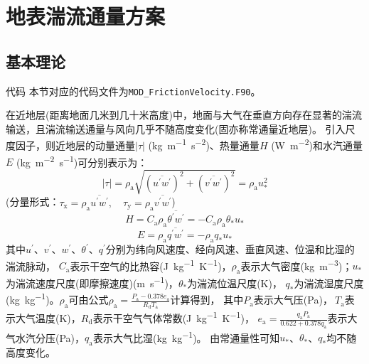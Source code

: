 \chapter{地表湍流通量方案}\label{ch:地表湍流通量}

\section{基本理论}\label{基本理论}
\begin{mymdframed}{代码}
  本节对应的代码文件为\texttt{MOD\_FrictionVelocity.F90}。
\end{mymdframed}

在近地层(距离地面几米到几十米高度)中，地面与大气在垂直方向存在显著的湍流输送，且湍流输送通量与风向几乎不随高度变化(固亦称常通量近地层)。
引入尺度因子，则近地层的动量通量$\left|\tau\right|$ (\unit{kg.m^{-1}.s^{-2}})、热量通量$H$ (\unit{W.m^{-2}})和水汽通量$E$ (\unit{kg.m^{-2}.s^{-1}})可分别表示为：
\begin{equation}
  |\tau|=\rho_{\mathrm{a}} \sqrt{ \left(\overline{u^{\prime} w^{\prime}}\right)^{2} + \left(\overline{v^{\prime} w^{\prime}}\right)^{2} }=\rho_{\mathrm{a}} u_{*}^{2}
\end{equation}
(分量形式：$\tau_{\mathrm{x}}=\rho_{\mathrm{a}} \overline{u^{\prime} w^{\prime}}, \quad \tau_{\mathrm{y}}=\rho_{\mathrm{a}} \overline{v^{\prime} w^{\prime}}$)
\begin{equation}
  H=C_{\mathrm{a}} \rho_{\mathrm{a}} \overline{\theta^{\prime} w^{\prime}}=-C_{\mathrm{a}} \rho_{\mathrm{a}} \theta_{\mathrm{*}} u_{*}
\end{equation}
\begin{equation}
  E=\rho_{\mathrm{a}} \overline{q^{\prime} w^{\prime}}=-\rho_{\mathrm{a}} q_{*} u_{*}
\end{equation}
其中$u^\prime$、$v^\prime$、$w^\prime$、$\theta^\prime$、$q^\prime$分别为纬向风速度、经向风速、垂直风速、位温和比湿的湍流脉动，
$C_{\mathrm{a}}$表示干空气的比热容(\unit{J.kg^{-1}.K^{-1}})，$\rho_{\mathrm{a}}$表示大气密度(\unit{kg.m^{-3}})；$u_\ast$为湍流速度尺度(即摩擦速度)(\unit{m.s^{-1}})，$\theta_\ast$为湍流位温尺度(K)，
$q_\ast$为湍流湿度尺度(\unit{kg.kg^{-1}})。$\rho_{\mathrm{a}}$可由公式$\rho_{\mathrm{a}}=\frac{P_{\mathrm{a}}-0.378e_{\mathrm{a}}}{R_{\mathrm{d}}T_{\mathrm{a}}}$计算得到，
其中$P_{\mathrm{a}}$表示大气压(Pa)，$\ T_{\mathrm{a}}$表示大气温度(K)，$R_{\mathrm{d}}$表示干空气气体常数(\unit{J.kg^{-1}.K^{-1}})，
$e_{\mathrm{a}}=\frac{q_{\mathrm{a}}P_{\mathrm{a}}}{0.622+0.378q_{\mathrm{a}}}$表示大气水汽分压(Pa)，$q_{\mathrm{a}}$表示大气比湿(\unit{kg.kg^{-1}})。
由常通量性可知$u_\ast$、$\theta_\ast$、$q_\ast$均不随高度变化。


